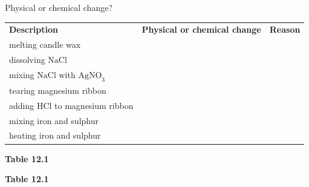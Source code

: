 \begin{Investigation}{Physical or chemical change? }
          \begin{table}[H]
        \begin{center}
      \label{m38709*id63990}
    \noindent
      \tablelasttail{}
      \begin{xtabular}[t]{|l|l|l|}\hline
                  \textbf{Description}
                 &
                  \textbf{Physical or chemical change}
                 &
                  \textbf{Reason}
     \tabularnewline{}
        melting candle wax &
         &
     \tabularnewline{}
        dissolving $\mathrm{NaCl}$ &
         &
     \tabularnewline{}
        mixing $\mathrm{NaCl}$ with ${\mathrm{AgNO}}_{3}$ &
         &
     \tabularnewline{}
        tearing magnesium ribbon &
         &
     \tabularnewline{}
        adding $\mathrm{HCl}$ to magnesium ribbon &
         &
     \tabularnewline{}
        mixing iron and sulphur &
         &
     \tabularnewline{}
        heating iron and sulphur &
         &
     \tabularnewline{}
    \end{xtabular}
      \end{center}
    \begin{center}{\small\bfseries Table 12.1}\end{center}
    \begin{caption}{\small\bfseries Table 12.1}\end{caption}
\end{table}
    \par
  \par 
\end{Investigation}
  \label{m38709**end}
